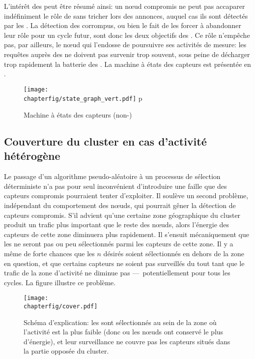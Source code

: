 L'intérêt des \vns peut être résumé ainsi: un nœud compromis ne peut pas accaparer indéfiniment le rôle de \cn sans tricher lors des annonces, auquel cas ils sont détectés par les \vns.
La détection des \cns corrompus, ou bien le fait de les forcer à abandonner leur rôle pour un cycle futur, sont donc les deux objectifs des \vns.
Ce rôle n'empêche pas, par ailleurs, le nœud qui l'endosse de poursuivre ses activités de mesure: les requêtes auprès des \cns ne doivent pas survenir trop souvent, sous peine de décharger trop rapidement la batterie des \vns.
La machine à états des capteurs est présentée en .
\begin{figure}[p]
    \centering
    \newlength\figuretotextheight
    \setlength\figuretotextheight\textheight
    \addtolength\figuretotextheight{-\abovecaptionskip}
    \addtolength\figuretotextheight{-\baselineskip}
    \texttt{[image: \\chapterfig/state\_graph\_vert.pdf]}%
    \newbox\dpbox%
    \setbox\dpbox\hbox{p}%
    \vspace{-\dp\dpbox}%
    \caption{Machine à états des capteurs (non-\cn)}\label{se:fig:states}%
\end{figure}

    \subsection{Couverture du cluster en cas d'activité hétérogène}

Le passage d'un algorithme pseudo-aléatoire à un processus de sélection déterministe n'a pas pour seul inconvénient d'introduire une faille que des capteurs compromis pourraient tenter d'exploiter.
Il soulève un second problème, indépendant du comportement des nœuds, qui pourrait gêner la détection de capteurs compromis.
S'il advient qu'une certaine zone géographique du cluster produit un trafic plus important que le reste des nœuds, alors l'énergie des capteurs de cette zone diminuera plus rapidement.
Il s'ensuit mécaniquement que les \cns ne seront pas ou peu sélectionnés parmi les capteurs de cette zone.
Il y a même de forte chances que les $n$ \cns désirés soient sélectionnés en dehors de la zone en question, et que certains capteurs ne soient pas surveillés du tout tant que le trafic de la zone d'activité ne diminue pas ---~potentiellement pour tous les cycles.
La figure  illustre ce problème.
\begin{figure}[ht]
    \centering
    \texttt{[image: \\chapterfig/cover.pdf]}
    \caption[Schéma d'explication: problème de couverture]{Schéma d'explication: les \cns sont sélectionnés au sein de la zone où l'activité est la plus faible (donc ou les nœuds ont conservé le plus d'énergie), et leur surveillance ne couvre pas les capteurs situés dans la partie opposée du cluster.}\label{se:fig:cover}
\end{figure}

